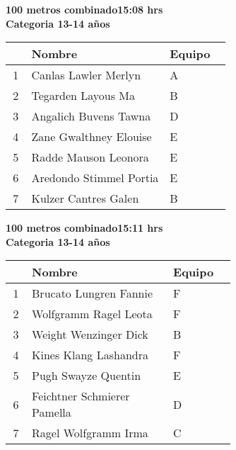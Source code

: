 \begin{minipage}{0.95\linewidth}\vspace{0.5cm} 
\begin{flushleft}
\textbf{
\hspace{-0.15cm}100 metros combinado\hspace{1.5cm}15:08 hrs \\Categoria 13-14 años}\vspace{-0.2cm} 
\end{flushleft}
\begin{tabular}{cp{0.63\linewidth}l}
\hline
& \textbf{Nombre} & \textbf{Equipo} \\ \hline
1 & Canlas Lawler Merlyn & A \\ 
2 & Tegarden Layous Ma & B \\ 
3 & Angalich Buvens Tawna & D \\ 
4 & Zane Gwalthney Elouise & E \\ 
5 & Radde Mauson Leonora & E \\ 
6 & Aredondo Stimmel Portia & E \\ 
7 & Kulzer Cantres Galen & B \\ 
\end{tabular}
\end{minipage}
\begin{minipage}{0.95\linewidth}\vspace{0.5cm} 
\begin{flushleft}
\textbf{
\hspace{-0.15cm}100 metros combinado\hspace{1.5cm}15:11 hrs \\Categoria 13-14 años}\vspace{-0.2cm} 
\end{flushleft}
\begin{tabular}{cp{0.63\linewidth}l}
\hline
& \textbf{Nombre} & \textbf{Equipo} \\ \hline
1 & Brucato Lungren Fannie & F \\ 
2 & Wolfgramm Ragel Leota & F \\ 
3 & Weight Wenzinger Dick & B \\ 
4 & Kines Klang Lashandra & F \\ 
5 & Pugh Swayze Quentin & E \\ 
6 & Feichtner Schmierer Pamella & D \\ 
7 & Ragel Wolfgramm Irma & C \\ 
\end{tabular}
\end{minipage}
